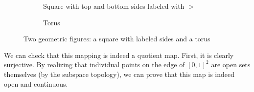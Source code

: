 \begin{example}[Torus]
\begin{figure}[H]
\begin{subfigure}[b]{0.48\textwidth}
          \caption{Square with top and bottom sides labeled with $>$}
          \label{fig:square_torus}
        \end{subfigure}
        \hfill 
        \begin{subfigure}[b]{0.48\textwidth}
          \centering
          \caption{Torus}
          \label{fig:torus}
        \end{subfigure}
        \caption{Two geometric figures: a square with labeled sides and a torus}
        \label{fig:geometric-figures}
      \end{figure}
      
      We can check that this mapping is indeed a quotient map. First, it is clearly surjective. By realizing that individual points on the edge of $[0,1]^2$ are open sets themselves (by the subspace topology), we can prove that this map is indeed open and continuous. 
    \end{example}

